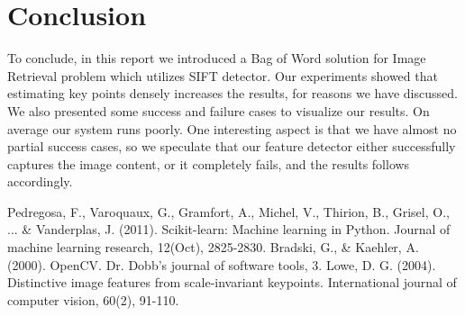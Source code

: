 \documentclass[conference,compsoc]{IEEEtran}
\begin{document}
\section{Conclusion}
To conclude, in this report we introduced a Bag of Word solution for Image Retrieval problem which utilizes SIFT detector. Our experiments showed that estimating key points densely increases the results, for reasons we have discussed. We also presented some success and failure cases to visualize our results. On average our system runs poorly. One interesting aspect is that we have almost no partial success cases, so we speculate that our feature detector either successfully captures the image content, or it completely fails, and the results follows accordingly.





%
%
%
\begin{thebibliography}{1}


	Pedregosa, F., Varoquaux, G., Gramfort, A., Michel, V., Thirion, B., Grisel, O., ... \& Vanderplas, J. (2011). Scikit-learn: Machine learning in Python. Journal of machine learning research, 12(Oct), 2825-2830.
	Bradski, G., \& Kaehler, A. (2000). OpenCV. Dr. Dobb’s journal of software tools, 3.
	Lowe, D. G. (2004). Distinctive image features from scale-invariant keypoints. International journal of computer vision, 60(2), 91-110.
\end{thebibliography}
\end{document}
